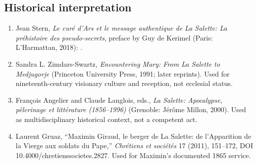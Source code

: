 \subsection{Historical interpretation}

\begin{enumerate}
  \item Jean Stern, \emph{Le curé d'Ars et le message authentique de La Salette: La préhistoire des pseudo-secrets}, preface by Guy de Kerimel (Paris: L'Harmattan, 2018): .
  \item Sandra L. Zimdars-Swartz, \emph{Encountering Mary: From La Salette to Medjugorje} (Princeton University Press, 1991; later reprints). Used for nineteenth-century visionary culture and reception, not ecclesial status.
  \item François Angelier and Claude Langlois, eds., \emph{La Salette: Apocalypse, pèlerinage et littérature (1856--1996)} (Grenoble: Jérôme Millon, 2000). Used as multidisciplinary historical context, not a competent act.
  \item Laurent Gruaz, ``Maximin Giraud, le berger de La Salette: de l'Apparition de la Vierge aux soldats du Pape,'' \emph{Chrétiens et sociétés} 17 (2011), 151--172, DOI 10.4000/chretienssocietes.2827. Used for Maximin's documented 1865 service.
\end{enumerate}

\endgroup
